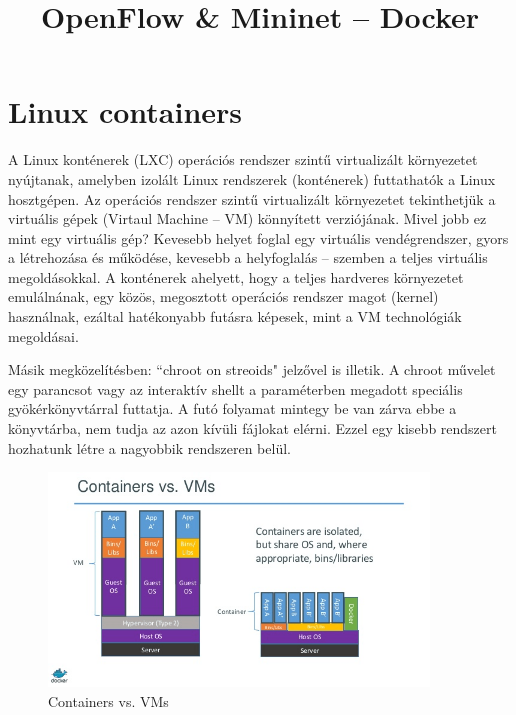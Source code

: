 \documentclass[a4paper]{article}
\title{OpenFlow \& Mininet – Docker}
\author{}
\date{}
\begin{document}
\maketitle

\tableofcontents

\section{Linux containers}
A Linux konténerek (LXC) operációs rendszer szintű virtualizált környezetet nyújtanak, amelyben izolált Linux
rendszerek (konténerek) futtathatók a Linux hosztgépen. Az operációs rendszer szintű virtualizált környezetet
tekinthetjük a virtuális gépek (Virtaul Machine – VM) könnyített verziójának. Mivel jobb ez mint egy virtuális gép?
Kevesebb helyet foglal egy virtuális vendégrendszer, gyors a létrehozása és működése, kevesebb a helyfoglalás – szemben
a teljes virtuális megoldásokkal. A konténerek ahelyett, hogy a teljes hardveres környezetet emulálnának, egy közös,
megosztott operációs rendszer magot (kernel) használnak, ezáltal hatékonyabb futásra képesek, mint a VM technológiák
megoldásai.

Másik megközelítésben: ``chroot on streoids" jelzővel is illetik. A chroot művelet egy parancsot vagy az interaktív
shellt a paraméterben megadott speciális gyökérkönyvtárral futtatja. A futó folyamat mintegy be van zárva ebbe a
könyvtárba, nem tudja az azon kívüli fájlokat elérni. Ezzel egy kisebb rendszert hozhatunk létre a nagyobbik rendszeren
belül.

\begin{figure}[H]
    \centering
    \includegraphics[width=0.9\textwidth]{figures/container_vs_vm.png}
    \caption{Containers vs. VMs}
    \label{fig:containers}
\end{figure}
\end{document}
